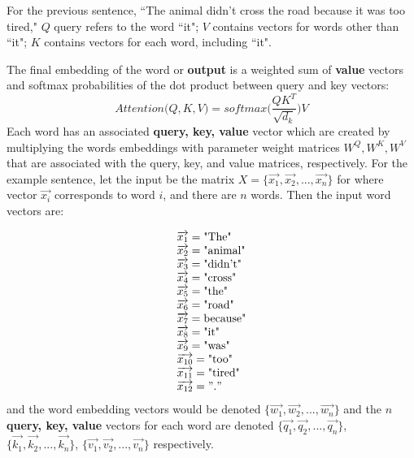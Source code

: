 For the previous sentence, ``The animal didn't cross the road because it was too tired,"  $Q$ query refers to the word ``it"; $V$ contains vectors for words other than ``it"; $K$ contains vectors for each word, including ``it".

The final embedding of the word or \textbf{output} is a weighted sum of \textbf{value} vectors and softmax probabilities of the dot product between query and key vectors: 
$$
Attention \Big(Q, K, V \Big) = softmax \Bigg(\frac {QK^T} {\sqrt{d_k}} \Bigg) V
$$
Each word has an associated \textbf{query, key, value} vector which are created by multiplying the words embeddings with parameter weight matrices $W^Q, W^K, W^V$ that are associated with the query, key, and value matrices, respectively. For the example sentence, let the input be the matrix $X = \{\overrightarrow{x_1}, \overrightarrow{x_2}, ..., \overrightarrow{x_n}\}$ for where vector $\overrightarrow{x_i}$ corresponds to word $i$, and there are $n$ words. Then the input word vectors are: 

$$
\begin{array}{ll}
\overrightarrow{x_1} = \text{"The"} \\
\overrightarrow{x_2} = \text{"animal"} \\
\overrightarrow{x_3} = \text{"didn't"} \\
\overrightarrow{x_4} = \text{"cross"} \\
\overrightarrow{x_5} = \text{"the"} \\
\overrightarrow{x_6} = \text{"road"} \\
\overrightarrow{x_7} = \text{because"} \\
\overrightarrow{x_8} = \text{"it"} \\
\overrightarrow{x_9} = \text{"was"} \\
\overrightarrow{x_{10}} = \text{"too"} \\
\overrightarrow{x_{11}} = \text{"tired"} \\
\overrightarrow{x_{12}} = "." \\
\end{array}
$$
and the word embedding vectors would be denoted $\Big\{ \overrightarrow{w_1}, \overrightarrow{w_2}, ..., \overrightarrow{w_n} \Big\}$ and the $n$ \textbf{query, key, value} vectors for each word are denoted $\Big\{\overrightarrow{q_1}, \overrightarrow{q_2}, ..., \overrightarrow{q_n} \Big\}$, $\Big\{\overrightarrow{k_1}, \overrightarrow{k_2}, ..., \overrightarrow{k_n} \Big\}$, $\Big\{\overrightarrow{v_1}, \overrightarrow{v_2}, ..., \overrightarrow{v_n} \Big\}$ respectively.


